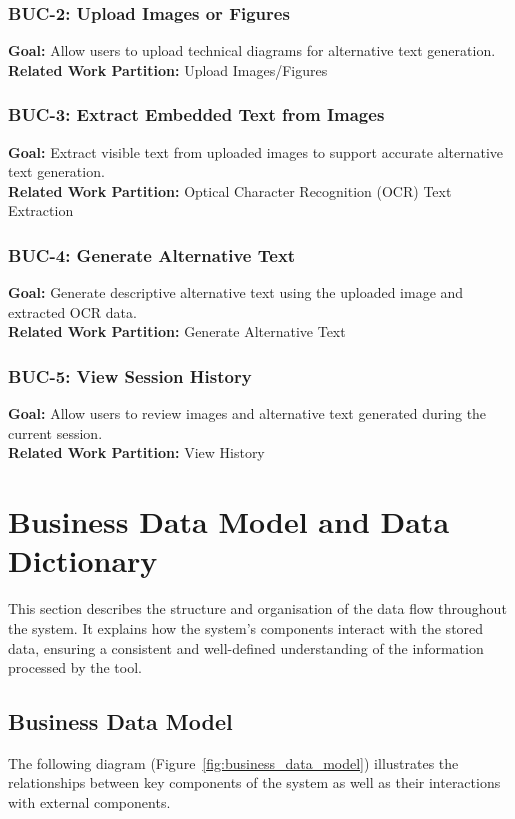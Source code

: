 \documentclass[12pt]{article}
\begin{document}
\subsubsection*{BUC-2: Upload Images or Figures}

\textbf{Goal:} Allow users to upload technical diagrams for alternative
text generation.\\
\textbf{Related Work Partition:} Upload Images/Figures

\subsubsection*{BUC-3: Extract Embedded Text from Images}

\textbf{Goal:} Extract visible text from uploaded images to support
accurate alternative text generation.\\
\textbf{Related Work Partition:} Optical Character Recognition (OCR)
Text Extraction

\subsubsection*{BUC-4: Generate Alternative Text}

\textbf{Goal:} Generate descriptive alternative text using the
uploaded image and extracted OCR data.\\
\textbf{Related Work Partition:} Generate Alternative Text

\subsubsection*{BUC-5: View Session History}

\textbf{Goal:} Allow users to review images and alternative text
generated during the current session.\\
\textbf{Related Work Partition:} View History


\section{Business Data Model and Data Dictionary}
This section describes the structure and organisation of the data flow throughout the system. It explains how the system’s components interact with the stored data, ensuring a consistent and well-defined understanding of the information processed by the tool.

\subsection{Business Data Model}
The following diagram (Figure~\ref{fig:business_data_model}) illustrates the relationships between key components of the system as well as their interactions with external components.
\end{document}
